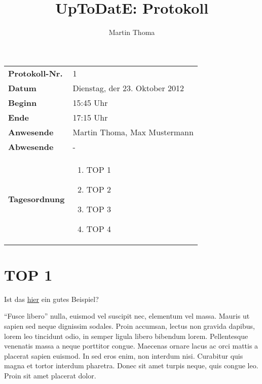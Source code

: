 \documentclass[11pt,a4paper,oneside]{scrartcl}
\newcommand\yourTitle{UpToDatE: Protokoll}
\newcommand\protokollNr{1}
\newcommand\Schriftfuehrer{Martin Thoma}
\begin{document}
 \author{\Schriftfuehrer}
 \title{\yourTitle}


\begin{center}
    \begin{tabular}{p{4.0cm} p{11.2cm}}
        \textbf{Protokoll-Nr.}      & \protokollNr\\
        \textbf{Datum}              & Dienstag, der 23. Oktober 2012\\
        \textbf{Beginn}             & 15:45 Uhr\\
        \textbf{Ende}               & 17:15 Uhr\\
        \textbf{Anwesende}          & Martin Thoma, Max Mustermann\\
        \textbf{Abwesende}          & -\\
        \textbf{Tagesordnung}       & \vspace{-7mm}%
                \begin{enumerate}[leftmargin=1.3em]%
                    \setlength{\itemsep}{-2pt}%
                    \item TOP 1
                    \item TOP 2
                    \item TOP 3
                    \item TOP 4
                \end{enumerate}
    \end{tabular}
\end{center}

\section*{TOP 1}
Ist das \href{http://www.digitale-schule-bayern.de/dsdaten/8/825.pdf}{hier}
ein gutes Beispiel?

"`Fusce libero"' nulla, euismod vel suscipit nec, elementum vel massa.
Mauris ut sapien sed neque dignissim sodales. Proin accumsan, lectus
non gravida dapibus, lorem leo tincidunt odio, in semper ligula
libero bibendum lorem. Pellentesque venenatis massa a neque porttitor
congue. Maecenas ornare lacus ac orci mattis a placerat sapien
euismod. In sed eros enim, non interdum nisi. Curabitur quis magna
et tortor interdum pharetra. Donec sit amet turpis neque, quis congue
leo. Proin sit amet placerat dolor.
\end{document}
